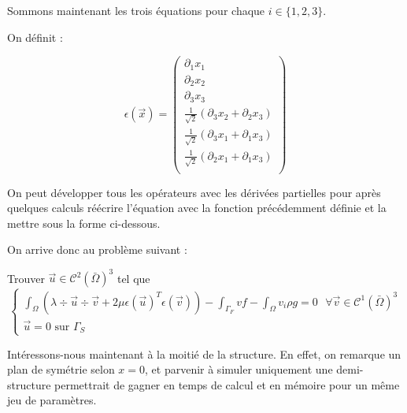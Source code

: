 Sommons maintenant les trois équations pour chaque $i \in \{1,2,3\}$.

On définit :

$$
\epsilon(\vec{x})=
\begin{pmatrix}
    \partial_1 x_1\\
    \partial_2 x_2\\ 
    \partial_3 x_3\\
    \frac{1}{\sqrt{2}}(\partial_3 x_2 + \partial_2 x_3)\\
    \frac{1}{\sqrt{2}}(\partial_3 x_1 + \partial_1 x_3)\\
    \frac{1}{\sqrt{2}}(\partial_2 x_1 + \partial_1 x_3)\\
\end{pmatrix}
$$

On peut développer tous les opérateurs avec les dérivées partielles pour après quelques calculs réécrire l'équation avec la fonction précédemment définie et la mettre sous la forme ci-dessous.

On arrive donc au problème suivant  :

Trouver $\vec{u} \in \mathcal{C}^2(\bar{\Omega})^3$ tel que
\begin{equation}
    \begin{cases}
        \displaystyle\int_{\Omega} (\lambda \div \vec{u} \div \vec{v} + 2\mu \epsilon(\vec{u})^T \epsilon(\vec{v})) - \int_{\Gamma_F} v f - \int_\Omega v_i \rho g = 0 \textrm{ } \forall \vec{v} \in \mathcal{C}^1(\bar{\Omega})^3\\
        \vec{u} = 0 \textrm{ sur } \Gamma_S
    \end{cases}
\end{equation}

Intéressons-nous maintenant à la moitié de la structure. En effet, on remarque un plan de symétrie selon $x=0$, et parvenir à simuler uniquement une demi-structure permettrait de gagner en temps de calcul et en mémoire pour un même jeu de paramètres.


